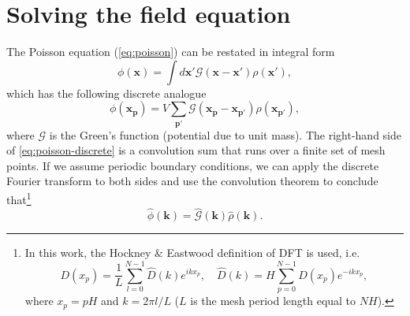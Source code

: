 \section{Solving the field equation}\label{sec:solving-the-field-equation}
The Poisson equation (\autoref{eq:poisson}) can be restated in integral form
\begin{equation*}
    \phi(\mathbf{x}) = \int d\mathbf{x}' \mathcal{G}(\mathbf{x}-\mathbf{x}')\rho(\mathbf{x}'),
\end{equation*}
which has the following discrete analogue
\begin{equation}\label{eq:poisson-discrete}
    \phi(\mathbf{x}_\mathbf{p}) = V \sum_{\mathbf{p}'} \mathcal{G}(\mathbf{x}_\mathbf{p} - \mathbf{x}_{\mathbf{p}'}) \rho(\mathbf{x}_{\mathbf{p}'}),
\end{equation}
where $\mathcal{G}$ is the Green's function (potential due to unit mass).
The right-hand side of \autoref{eq:poisson-discrete} is a convolution sum that runs over a finite set of mesh points.
If we assume periodic boundary conditions, we can apply the discrete Fourier transform to both sides and use the convolution theorem to conclude that\footnote{
    In this work, the Hockney \& Eastwood definition of DFT is used, i.e.
    \begin{equation*}
        D(x_p) = \frac{1}{L}\sum_{l=0}^{N-1}\hat{D}(k)e^{ikx_p}, \quad \hat{D}(k) = H\sum_{p=0}^{N-1}D(x_p)e^{-ikx_p},
    \end{equation*}
    where $x_p = pH$ and $k=2\pi l / L$ ($L$ is the mesh period length equal to $NH$).
}
\begin{equation}\label{eq:poisson-fourier-product}
    \hat{\phi}(\mathbf{k}) = \hat{\mathcal{G}}(\mathbf{k}) \hat{\rho}(\mathbf{k}).
\end{equation}

